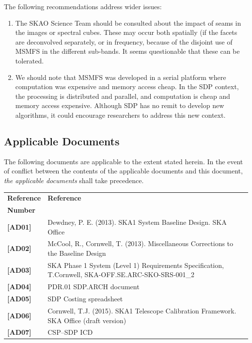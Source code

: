 \documentclass[11pt,a4paper,variablewidth]{article}
\begin{document}
The following recommendations address wider issues:
\begin{enumerate}[resume]
\item The SKAO Science Team should be consulted about the impact of seams in the images or spectral cubes. These may occur both spatially (if the facets are deconvolved separately, or in frequency, because of the disjoint use of MSMFS in the different sub-bands. It seems questionable that these can be tolerated.

\item We should note that MSMFS was developed in a serial platform where computation was expensive and memory access cheap. In the SDP context, the processing is distributed and parallel, and computation is cheap and memory access expensive. Although SDP has no remit to develop new algorithms, it could encourage researchers to address this new context.
\end{enumerate}



\newpage

\sdpreferencedocs

\subsection*{Applicable Documents}

The following documents are applicable to the extent stated herein. In the
event of conflict between the contents of the applicable documents and this
document, \emph{the applicable documents} shall take precedence.

 \begin{center}
 \begin{tabularx}{\textwidth}{|l|X|}
     \hline
     \bf{Reference} & \bf{Reference}\\
     \bf{Number} & \\
     \hline
     {\bf [AD01]} & Dewdney, P. E. (2013). SKA1 System Baseline Design. SKA Office\\
     {\bf [AD02]} & McCool, R., Cornwell, T. (2013). Miscellaneous Corrections
     to the Baseline Design\\
     {\bf [AD03]} & SKA Phase 1 System (Level 1) Requirements Specification, T.Cornwell, SKA-OFF.SE.ARC-SKO-SRS-001\_2\\
     {\bf [AD04]} & PDR.01 SDP.ARCH document\\
     {\bf [AD05]} & SDP Costing spreadsheet\\
     {\bf [AD06]} & Cornwell, T.J. (2015). SKA1 Telescope Calibration
     Framework. SKA Office (draft version)\\
     {\bf [AD07]} & CSP--SDP ICD\\
     \hline
   \end{tabularx}
\end{center}
\end{document}
